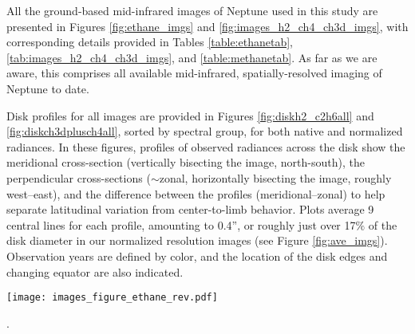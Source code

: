 \documentclass[twocolumn,10pt]{aastex631}
\begin{document}
 

\appendix \label{appendix}
All the ground-based mid-infrared images of Neptune used in this study are presented in Figures \ref{fig:ethane_imgs} and \ref{fig:images_h2_ch4_ch3d_imgs}, with corresponding details provided in Tables \ref{table:ethanetab}, \ref{tab:images_h2_ch4_ch3d_imgs}, and \ref{table:methanetab}.  As far as we are aware, this comprises all available mid-infrared, spatially-resolved imaging of Neptune to date. 

Disk profiles for all images are provided in Figures \ref{fig:diskh2_c2h6all} and \ref{fig:diskch3dplusch4all}, sorted by spectral group, for both native and normalized radiances. In these figures, profiles of observed radiances across the disk show the meridional cross-section (vertically bisecting the image, north-south), the perpendicular cross-sections ($\sim$zonal, horizontally bisecting the image, roughly west--east), and the difference between the profiles (meridional--zonal) to help separate latitudinal variation from center-to-limb behavior. Plots average 9 central lines for each profile, amounting to 0.4'', or roughly just over 17$\%$ of the disk diameter in our normalized resolution images (see Figure \ref{fig:ave_imgs}).  Observation years are defined by color, and the location of the disk edges and changing equator are also indicated.


\begin{figure*}
    \centering
    \texttt{[image: images\_figure\_ethane\_rev.pdf]}
    \caption{N-band images of Neptune sensitive to stratospheric ethane emission with effective filtered wavelengths of 11.6 $\mu$m, dating from 2003 to 2020. The date (yyyy-mm-dd), imaging instrument, and effective filter wavelength for each image are stated. Insets of the accompanying calibration stars, when available, are shown to indicate the respective spatial resolutions of the seeing disks near the time of the observations. Image details are provided in Table \ref{tab:ethane}}.
    \label{fig:ethane_imgs}
\end{figure*}
\end{document}
